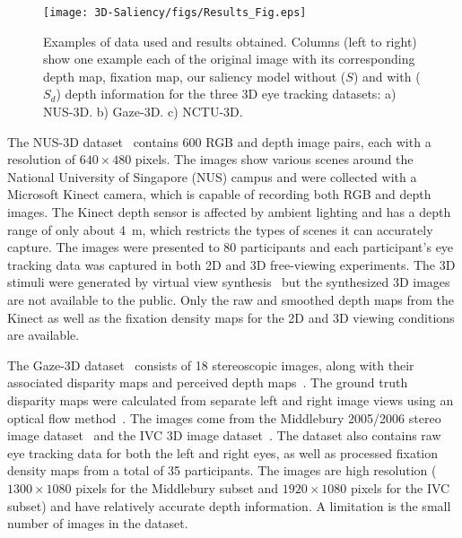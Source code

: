 \begin{figure}[t]
\centering
\texttt{[image: 3D-Saliency/figs/Results\_Fig.eps]}
\makeatletter
\let\@currsize\normalsize
\caption[Examples of 3D image data used and saliency maps obtained]{Examples of data used and results obtained. Columns (left to right) show one example each of the original image with its corresponding depth map, fixation map, our saliency model without ($S$) and with ($S_d$) depth information for the three 3D eye tracking datasets: a) NUS-3D. b) Gaze-3D. c) NCTU-3D.}
\label{Fig:Results}
\end{figure}

The NUS-3D dataset~\citep{Lang_etal12} contains 600 RGB and depth image pairs, each with a resolution of $640\times480$ pixels. The images show various scenes around the National University of Singapore (NUS) campus and were collected with a Microsoft Kinect camera, which is capable of recording both RGB and depth images. The Kinect depth sensor is affected by ambient lighting and has a depth range of only about 4~m, which restricts the types of scenes it can accurately capture. The images were presented to 80 participants and each participant's eye tracking data was captured in both 2D and 3D free-viewing experiments. The 3D stimuli were generated by virtual view synthesis~\cite[see][for details]{Lang_etal12} but the synthesized 3D images are not available to the public. Only the raw and smoothed depth maps from the Kinect as well as the fixation density
maps for the 2D and 3D viewing conditions are available.

The Gaze-3D dataset~\citep{Wang_etal13} consists of 18 stereoscopic images, along with their associated disparity maps and perceived depth maps~\cite[perceived depth is computed from raw disparity by taking into account viewing distance and display properties; see][for details]{Wang_etal13}. The ground truth disparity maps were calculated from separate left and right image views using an optical flow method~\citep{Werlberger_etal09}. The images come from the Middlebury 2005/2006 stereo image dataset~\citep{Scharstein_Pal07} and the IVC 3D image dataset~\citep{Urvoy_etal12}. The dataset also contains raw eye tracking data for both the left and right eyes, as well as processed fixation density maps from a total of 35 participants. The images are high resolution ($1300\times1080$ pixels for the Middlebury subset and $1920\times1080$ pixels for the IVC subset) and have relatively accurate depth information. A limitation is the small number of images in the dataset.

